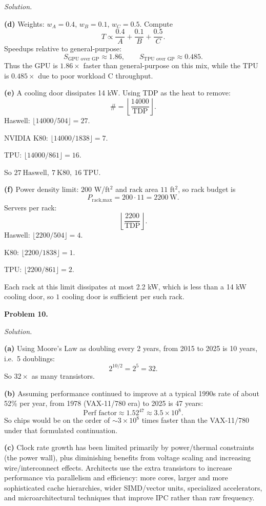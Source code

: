 \documentclass[12pt]{article}
\newcommand{\problem}[1]{\vspace{0.5em}\noindent\textbf{Problem #1.}\vspace{0.3em}}
\newenvironment{solution}{\par\noindent\textit{Solution.}}{\par\vspace{1em}}
\newcommand{\subproblem}[1]{\par\noindent\textbf{(#1)}\quad}
\begin{document}
\begin{solution}
\subproblem{d}
Weights: $w_A=0.4$, $w_B=0.1$, $w_C=0.5$.
Compute
\[
T \propto \frac{0.4}{A}+\frac{0.1}{B}+\frac{0.5}{C}.
\]
Speedups relative to general-purpose:
\[
S_{\text{GPU over GP}}\approx 1.86,\qquad
S_{\text{TPU over GP}}\approx 0.485.
\]
Thus the GPU is \(\boxed{1.86\times}\) faster than general-purpose on this mix, while the TPU is \(\boxed{0.485\times}\) due to poor workload C throughput.

\subproblem{e}
A cooling door dissipates 14 kW. Using TDP as the heat to remove:
\[
\#=\left\lfloor \frac{14000}{\text{TDP}}\right\rfloor.
\]
Haswell: $\lfloor 14000/504\rfloor=27$.

NVIDIA K80: $\lfloor 14000/1838\rfloor=7$.

TPU: $\lfloor 14000/861\rfloor=16$.

So \(\boxed{27\ \text{Haswell},\ 7\ \text{K80},\ 16\ \text{TPU}}\).

\subproblem{f}
Power density limit: $200$ W/ft$^2$ and rack area $11$ ft$^2$, so rack budget is
\[
P_{\text{rack,max}}=200\cdot 11 = 2200\ \text{W}.
\]
Servers per rack:
\[
\left\lfloor \frac{2200}{\text{TDP}}\right\rfloor.
\]
Haswell: $\lfloor 2200/504\rfloor=4$.

K80: $\lfloor 2200/1838\rfloor=1$.

TPU: $\lfloor 2200/861\rfloor=2$.

Each rack at this limit dissipates at most 2.2 kW, which is less than a 14 kW cooling door, so \(\boxed{1}\) cooling door is sufficient per such rack.

\end{solution}

\problem{10}
\begin{solution}
\subproblem{a}
Using Moore's Law as doubling every 2 years, from 2015 to 2025 is 10 years, i.e.\ 5 doublings:
\[
2^{10/2}=2^5=32.
\]
So \(\boxed{32\times}\) as many transistors.

\subproblem{b}
Assuming performance continued to improve at a typical 1990s rate of about 52\% per year, from 1978 (VAX-11/780 era) to 2025 is 47 years:
\[
\text{Perf factor} \approx 1.52^{47}\approx 3.5\times 10^8.
\]
So chips would be on the order of \(\boxed{\sim 3\times 10^8}\) times faster than the VAX-11/780 under that formulated continuation.

\subproblem{c}
Clock rate growth has been limited primarily by power/thermal constraints (the power wall), plus diminishing benefits from voltage scaling and increasing wire/interconnect effects.
Architects use the extra transistors to increase performance via parallelism and efficiency: more cores, larger and more sophisticated cache hierarchies, wider SIMD/vector units, specialized accelerators, and microarchitectural techniques that improve IPC rather than raw frequency.

\end{solution}
\end{document}
